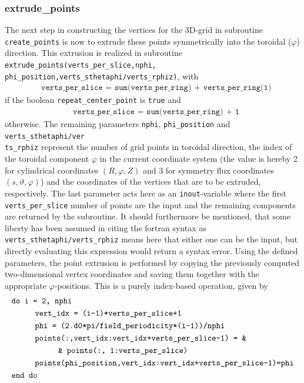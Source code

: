 \documentclass[./main.tex]{subfiles}
\begin{document}
\subsubsection{extrude\_points}
The next step in constructing the vertices for the 3D-grid in subroutine \texttt{create\_points} is now to extrude these points symmetrically into the toroidal ($\varphi$) direction. This extrusion is realized in subroutine \texttt{extrude\_points(verts\_per\_slice,nphi,}\\
\texttt{phi\_position,verts\_sthetaphi/verts\_rphiz)}, with
\begin{align*}
&\texttt{verts\_per\_slice = sum(verts\_per\_ring) + verts\_per\_ring(1)}
\end{align*}
if the boolean \texttt{repeat\_center\_point} is \texttt{true} and
\begin{align*}
&\texttt{verts\_per\_slice = sum(verts\_per\_ring) + 1}
\end{align*}
otherwise. The remaining parameters \texttt{nphi}, \texttt{phi\_position} and \texttt{verts\_sthetaphi/ver}\\
\texttt{ts\_rphiz} represent the number of grid points in toroidal direction, the index of the toroidal component $\varphi$ in the current coordinate system (the value is hereby 2 for cylindrical coordinates $(R,\varphi,Z)$ and 3 for symmetry flux coordinates $(s,\vartheta,\varphi)$) and the coordinates of the vertices that are to be extruded, respectively. The last parameter acts here as an \texttt{inout}-variable where the first \texttt{verts\_per\_slice} number of points are the input and the remaining components are returned by the subroutine. It should furthermore be mentioned, that some liberty has been assumed in citing the fortran syntax as \texttt{verts\_sthetaphi/verts\_rphiz} means here that either one can be the input, but directly evaluating this expression would return a syntax error. Using the defined parameters, the point extrusion is performed by copying the previously computed two-dimensional vertex coordinates and saving them together with the appropriate $\varphi$-positions. This is a purely index-based operation, given by 
\begin{align*}
&    \texttt{do i = 2, nphi}\\
& \hspace{1.cm}  \texttt{vert\_idx = (i-1)*verts\_per\_slice+1}\\
& \hspace{1.cm}  \texttt{phi = (2.d0*pi/field\_periodicity*(i-1))/nphi}\\
& \hspace{1.cm}  \texttt{points(:,vert\_idx:vert\_idx+verts\_per\_slice-1) = \&}\\
& \hspace{2.cm}  \texttt{\& points(:, 1:verts\_per\_slice)}\\
& \hspace{1.cm}  \texttt{points(phi\_position,vert\_idx:vert\_idx+verts\_per\_slice-1)=phi}\\
&    \texttt{end do}
\end{align*}
\end{document}
